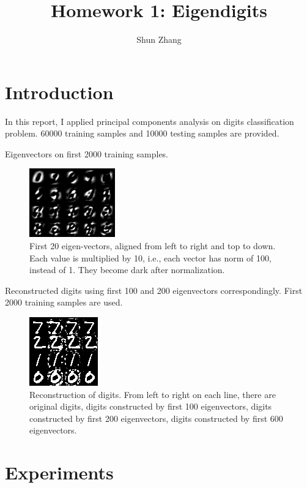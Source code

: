 \documentclass[10pt]{article}
\title{Homework 1: Eigendigits}
\author{Shun Zhang}
\date{}
\begin{document}
\maketitle

\section{Introduction}

In this report, I applied principal components analysis on digits
classification problem. 60000 training samples and 10000 testing
samples are provided.

Eigenvectors on first 2000 training samples.

\begin{figure}[b]
\centering
\includegraphics[]{eigen.png}
\caption{First 20 eigen-vectors, aligned from left to right and top to
down. Each value is multiplied by 10, i.e., each vector has norm of
100, instead of 1. They become dark after normalization.}
\label{fig:eigen}
\end{figure}

Reconstructed digits using first 100 and 200 eigenvectors
correspondingly. First 2000 training samples are used. 

\begin{figure}[b]
\centering
\includegraphics[]{test.png}
\caption{Reconstruction of digits. From left to right on each line,
there are original digits, digits constructed by first 100
eigenvectors, digits constructed by first 200 eigenvectors, digits
constructed by first 600 eigenvectors. }
\label{fig:test}
\end{figure}

\section{Experiments}
\end{document}
